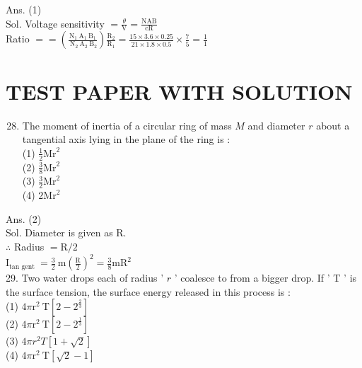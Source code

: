 \documentclass[10pt]{article}
\begin{document}
Ans. (1)\\
Sol. Voltage sensitivity \(=\frac{\theta}{\mathrm{V}}=\frac{\mathrm{NAB}}{\mathrm{cR}}\)\\
Ratio \(==\left(\frac{\mathrm{N}_{1} \mathrm{~A}_{1} \mathrm{~B}_{1}}{\mathrm{~N}_{2} \mathrm{~A}_{2} \mathrm{~B}_{2}}\right) \frac{\mathrm{R}_{2}}{\mathrm{R}_{1}}=\frac{15 \times 3.6 \times 0.25}{21 \times 1.8 \times 0.5} \times \frac{7}{5}=\frac{1}{1}\)

\section*{TEST PAPER WITH SOLUTION}
\begin{enumerate}
  \setcounter{enumi}{27}
  \item The moment of inertia of a circular ring of mass \(M\) and diameter \(r\) about a tangential axis lying in the plane of the ring is :\\
(1) \(\frac{1}{2} \mathrm{Mr}^{2}\)\\
(2) \(\frac{3}{8} \mathrm{Mr}^{2}\)\\
(3) \(\frac{3}{2} \mathrm{Mr}^{2}\)\\
(4) \(2 \mathrm{Mr}^{2}\)
\end{enumerate}

Ans. (2)\\
Sol. Diameter is given as R.\\
\(\therefore\) Radius \(=\mathrm{R} / 2\)\\
\(\mathrm{I}_{\text {tan gent }}=\frac{3}{2} \mathrm{~m}\left(\frac{\mathrm{R}}{2}\right)^{2}=\frac{3}{8} \mathrm{mR}^{2}\)\\
29. Two water drops each of radius ' \(r\) ' coalesce to from a bigger drop. If ' T ' is the surface tension, the surface energy released in this process is :\\
(1) \(4 \pi \mathrm{r}^{2} \mathrm{~T}\left[2-2^{\frac{2}{3}}\right]\)\\
(2) \(4 \pi \mathrm{r}^{2} \mathrm{~T}\left[2-2^{\frac{1}{3}}\right]\)\\
(3) \(4 \pi r^{2} T[1+\sqrt{2}]\)\\
(4) \(4 \pi \mathrm{r}^{2} \mathrm{~T}[\sqrt{2}-1]\)
\end{document}

